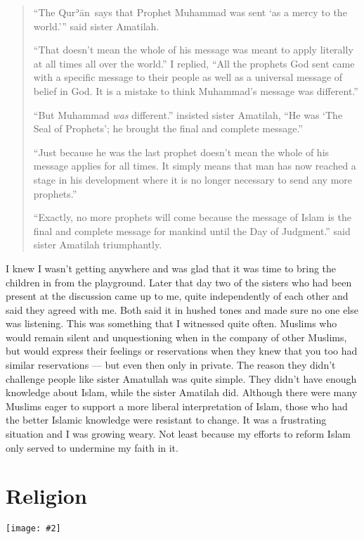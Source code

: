 \documentclass[12pt]{memoir}
\def\´{ʾ} %
\newcommand{\cor}[2]{#2} %
\def \Quran{Qur\-\´ān} %
\newcommand{\img}[3]{\begin{center}%
\texttt{[image: \#2]}\\{\small\em#3}%
\end{center}}
\begin{document}
\begin{quote}
“The \Quran\ says that Prophet Muhammad was sent ‘as a mercy to the world.’”
said sister Amatilah.

“That doesn’t mean the whole of his message was meant to apply literally
at all times all over the world.”
I replied,
“All the prophets God sent came with a specific message to their people
as well as a universal message of belief in God.
It is a mistake to think Muhammad’s message was different.”

“But Muhammad \emph{was} different.” insisted sister Amatilah,
“He was ‘The Seal of Prophets’; he brought the final and complete message.”

“Just because he was the last prophet doesn’t mean
the whole of his message applies for all times.
It simply means that man has now reached a stage in his development
where it is no\cor{-}{ }longer necessary to send any more prophets.”

“Exactly, no more prophets will come because the message of Islam is the final
and complete message for mankind until the Day of Judgment.”
said sister Amatilah triumphantly.
\end{quote}

I knew I wasn’t getting anywhere and was glad that it was time
to bring the children in from the playground.
Later that day two of the sisters who had been present at the discussion
came up to me, quite independently of each other and said they agreed with me.
Both said it in hushed tones and made sure no one else was listening.
This was something that I witnessed quite often.
Muslims who would remain silent and unquestioning
when in the company of other Muslims,
but would express their feelings or reservations when they knew
that you too had similar reservations — but even then only in private.
The reason they didn’t challenge people like sister Amatullah was quite simple.
They didn’t have enough knowledge about Islam, while the sister Amatilah did.
Although there were many Muslims eager to support
a more liberal interpretation of Islam,
those who had the better Islamic knowledge were resistant to change.
It was a frustrating situation and I was growing weary.
Not least because my efforts to reform Islam only served
to undermine my faith in it.


\chapter{Religion}

\img{scale=0.6}{Neasden_Temple.jpg}{}
\end{document}

